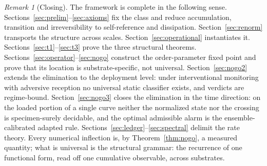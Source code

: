 \documentclass[11pt]{article}
\theoremstyle{plain}
\theoremstyle{definition}
\theoremstyle{remark}
\newtheorem{remark}[theorem]{Remark}
\begin{document}
\begin{remark}[Closing]
The framework is complete in the following sense. Sections~\ref{sec:prelim}--\ref{sec:axioms} fix the class and reduce accumulation, transition and irreversibility to self-reference and dissipation. Section~\ref{sec:renorm} transports the structure across scales. Section~\ref{sec:operational} instantiates it. Sections~\ref{sec:t1}--\ref{sec:t3} prove the three structural theorems. Sections~\ref{sec:operator}--\ref{sec:nogo} construct the order-parameter fixed point and prove that its location is substrate-specific, not universal. Section~\ref{sec:nogo2} extends the elimination to the deployment level: under interventional monitoring with adversive reception no universal static classifier exists, and verdicts are regime-bound. Section~\ref{sec:nogo3} closes the elimination in the time direction: on the loaded portion of a single curve neither the normalized state nor the crossing is specimen-surely decidable, and the optimal admissible alarm is the ensemble-calibrated adapted rule. Sections~\ref{sec:ledger}--\ref{sec:spectral} delimit the rate theory. Every numerical inflection is, by Theorem~\ref{thm:nogo}, a measured quantity; what is universal is the structural grammar: the recurrence of one functional form, read off one cumulative observable, across substrates.
\end{remark}
\end{document}
